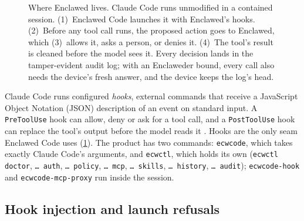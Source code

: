 \documentclass[11pt]{article}
\newcommand{\sys}{Enclawed}
\newcommand{\dev}{Enclaweder}
\newcommand{\cz}{Enclawed Code}
\begin{document}
\begin{figure}[!tbp]
\centering
\resizebox{\linewidth}{!}{}
\caption{Where \sys{} lives. Claude Code runs unmodified in a contained
session. (1)~\cz{} launches it with \sys{}'s hooks. (2)~Before any tool
call runs, the proposed action goes to \sys{}, which (3)~allows it, asks
a person, or denies it. (4)~The tool's result is cleaned before the model
sees it. Every decision lands in the tamper-evident audit log; with an
\dev{} bound, every call also needs the device's fresh answer, and the
device keeps the log's head.}
\label{fig:arch}
\end{figure}

Claude Code runs configured \emph{hooks}, external commands that receive
a JavaScript Object Notation (JSON) description of an event on standard
input. A \texttt{PreToolUse} hook can allow, deny or ask for a tool
call, and a \texttt{PostToolUse} hook can replace the tool's output
before the model reads it \cite{cc-hooks}. Hooks are the only seam \cz{}
uses (\cref{fig:arch}). The product has two commands:
\texttt{ecwcode}, which takes exactly Claude Code's arguments, and
\texttt{ecwctl}, which holds its own (\texttt{ecwctl doctor},
\texttt{\ldots{} auth}, \texttt{\ldots{} policy}, \texttt{\ldots{} mcp},
\texttt{\ldots{} skills}, \texttt{\ldots{} history}, \texttt{\ldots{}
audit}); \texttt{ecwcode-hook} and \texttt{ecwcode-mcp-proxy} run inside
the session.

\subsection{Hook injection and launch refusals}
\label{sec:inject}
\end{document}
